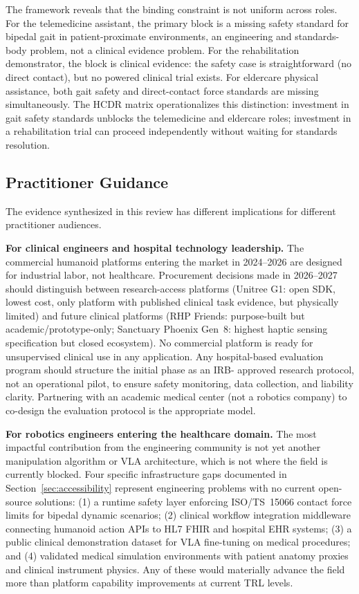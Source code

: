 \documentclass[acmsmall]{acmart}
\begin{document}
The framework reveals that the binding constraint is not uniform across roles.
For the telemedicine assistant, the primary block is a missing safety standard for
bipedal gait in patient-proximate environments, an engineering and standards-body
problem, not a clinical evidence problem. For the rehabilitation demonstrator, the
block is clinical evidence: the safety case is straightforward (no direct contact),
but no powered clinical trial exists. For eldercare physical assistance, both gait
safety and direct-contact force standards are missing simultaneously. The HCDR
matrix operationalizes this distinction: investment in gait safety standards
unblocks the telemedicine and eldercare roles; investment in a rehabilitation
trial can proceed independently without waiting for standards resolution.

\subsection{Practitioner Guidance}
\label{sec:practitioners}

The evidence synthesized in this review has different implications for different
practitioner audiences.

\textbf{For clinical engineers and hospital technology leadership.} The commercial
humanoid platforms entering the market in 2024--2026 are designed for industrial
labor, not healthcare. Procurement decisions made in 2026--2027 should distinguish
between research-access platforms (Unitree G1: open SDK, lowest cost, only
platform with published clinical task evidence, but physically limited) and future
clinical platforms (RHP Friends: purpose-built but academic/prototype-only; Sanctuary
Phoenix Gen~8: highest haptic sensing specification but closed ecosystem). No
commercial platform is ready for unsupervised clinical use in any application.
Any hospital-based evaluation program should structure the initial phase as an IRB-
approved research protocol, not an operational pilot, to ensure safety monitoring,
data collection, and liability clarity. Partnering with an academic medical center
(not a robotics company) to co-design the evaluation protocol is the appropriate
model.

\textbf{For robotics engineers entering the healthcare domain.} The most impactful
contribution from the engineering community is not yet another manipulation
algorithm or VLA architecture, which is not where the field is currently
blocked. Four specific
infrastructure gaps documented in Section~\ref{sec:accessibility} represent
engineering problems with no current open-source solutions: (1) a runtime safety
layer enforcing ISO/TS~15066 contact force limits for bipedal dynamic scenarios;
(2) clinical workflow integration middleware connecting humanoid action APIs to
HL7 FHIR and hospital EHR systems; (3) a public clinical demonstration dataset
for VLA fine-tuning on medical procedures; and (4) validated medical simulation
environments with patient anatomy proxies and clinical instrument physics. Any
of these would materially advance the field more than platform capability
improvements at current TRL levels.
\end{document}
